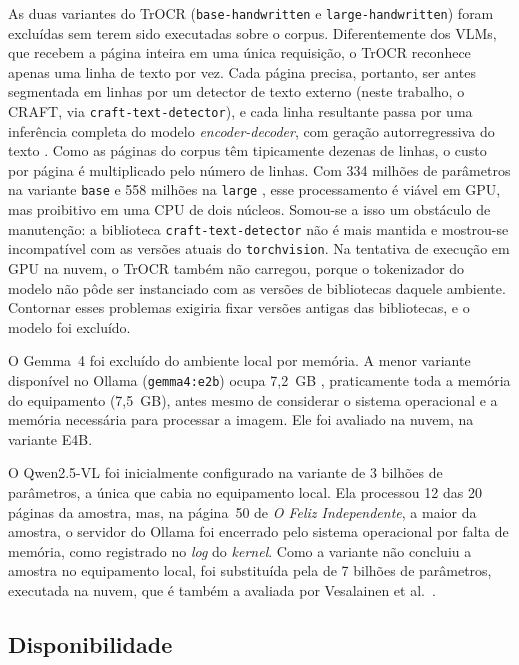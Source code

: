 \documentclass[noabntexcite,oneside]{ufsc-thesis-rn46-2019}
\begin{document}
As duas variantes do TrOCR (\texttt{base-handwritten} e \texttt{large-handwritten}) foram
excluídas sem terem sido executadas sobre o corpus. Diferentemente dos VLMs, que recebem a
página inteira em uma única requisição, o TrOCR reconhece apenas uma linha de texto por
vez. Cada página precisa, portanto, ser antes segmentada em linhas por um detector de
texto externo (neste trabalho, o CRAFT, via \texttt{craft-text-detector}), e cada linha
resultante passa por uma inferência completa do modelo \textit{encoder-decoder}, com
geração autorregressiva do texto \cite{huang2021}. Como as páginas do corpus têm
tipicamente dezenas de linhas, o custo por página é multiplicado pelo número de linhas. Com
334 milhões de parâmetros na variante \texttt{base} e 558 milhões na \texttt{large}
\cite{huang2021}, esse processamento é viável em GPU, mas proibitivo em uma CPU de dois
núcleos. Somou-se a isso um obstáculo de manutenção: a biblioteca
\texttt{craft-text-detector} não é mais mantida e mostrou-se incompatível com as versões
atuais do \texttt{torchvision}. Na tentativa de execução em GPU na nuvem, o TrOCR também
não carregou, porque o tokenizador do modelo não pôde ser instanciado com as versões de
bibliotecas daquele ambiente. Contornar esses problemas exigiria fixar versões antigas das
bibliotecas, e o modelo foi excluído.

O Gemma~4 foi excluído do ambiente local por memória. A menor variante disponível no Ollama
(\texttt{gemma4:e2b}) ocupa 7,2~GB \cite{ollama_gemma4}, praticamente toda a memória do
equipamento (7,5~GB), antes mesmo de considerar o sistema operacional e a memória
necessária para processar a imagem. Ele foi avaliado na nuvem, na variante E4B.

O Qwen2.5-VL foi inicialmente configurado na variante de 3 bilhões de parâmetros, a única
que cabia no equipamento local. Ela processou 12 das 20 páginas da amostra, mas, na
página~50 de \textit{O Feliz Independente}, a maior da amostra, o servidor do Ollama foi
encerrado pelo sistema operacional por falta de memória, como registrado no \textit{log} do
\textit{kernel}. Como a variante não concluiu a amostra no equipamento local, foi
substituída pela de 7 bilhões de parâmetros, executada na nuvem, que é também a avaliada
por Vesalainen et al.\ \cite{vesalainen2025}.

\subsection{Disponibilidade}
\end{document}
